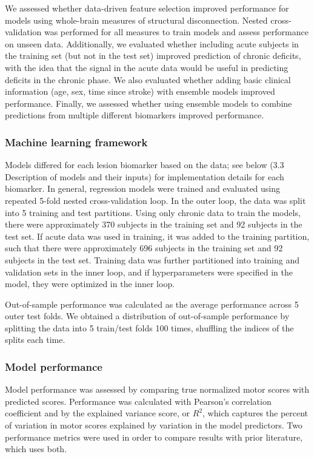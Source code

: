 \documentclass[phd,tocprelim]{cornell}
\begin{document}
We assessed whether data-driven feature selection improved performance for models using whole-brain measures of structural disconnection. Nested cross-validation was performed for all measures to train models and assess performance on unseen data.  Additionally, we evaluated whether including acute subjects in the training set (but not in the test set) improved prediction of chronic deficits, with the idea that the signal in the acute data would be useful in predicting deficits in the chronic phase. We also evaluated whether adding basic clinical information (age, sex, time since stroke) with ensemble models improved performance. Finally, we assessed whether using ensemble models to combine predictions from multiple different biomarkers improved performance.

\subsubsection{Machine learning framework}
Models differed for each lesion biomarker based on the data; see below (3.3 Description of models and their inputs) for implementation details for each biomarker. In general, regression models were trained and evaluated using repeated 5-fold nested cross-validation loop.  In the outer loop, the data was split into 5 training and test partitions. Using only chronic data to train the models, there were approximately 370 subjects in the training set and 92 subjects in the test set. If acute data was used in training, it was added to the training partition, such that there were approximately 696 subjects in the training set and 92 subjects in the test set. Training data was further partitioned into training and validation sets in the inner loop, and if hyperparameters were specified in the model, they were optimized in the inner loop. 

Out-of-sample performance was calculated as the average performance across 5 outer test folds. We obtained a distribution of out-of-sample performance by splitting the data into 5 train/test folds 100 times, shuffling the indices of the splits each time. 

\subsubsection{Model performance}
Model performance was assessed by comparing true normalized motor scores with predicted scores. Performance was calculated with Pearson's correlation coefficient and by the explained variance score, or $R^2$, which captures the percent of variation in motor scores explained by variation in the model predictors. Two performance metrics were used in order to compare results with prior literature, which uses both.
\end{document}
